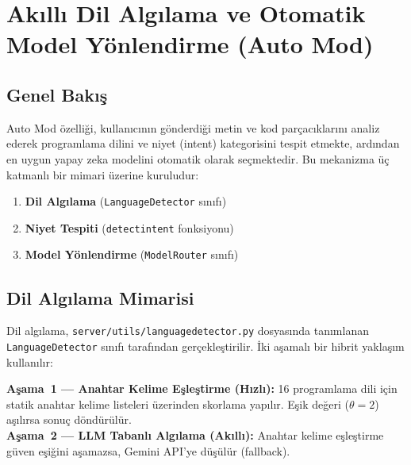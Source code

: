 \documentclass[12pt,a4paper]{article}
\begin{document}
\section{Akıllı Dil Algılama ve Otomatik Model Yönlendirme (Auto Mod)}
\label{sec:automod}

\subsection{Genel Bakış}

Auto Mod özelliği, kullanıcının gönderdiği metin ve kod parçacıklarını analiz ederek programlama dilini ve niyet (intent) kategorisini tespit etmekte, ardından en uygun yapay zeka modelini otomatik olarak seçmektedir. Bu mekanizma üç katmanlı bir mimari üzerine kuruludur:

\begin{enumerate}[label=\arabic*.]
    \item \textbf{Dil Algılama} (\texttt{LanguageDetector} sınıfı)
    \item \textbf{Niyet Tespiti} (\texttt{detect\textunderscore intent} fonksiyonu)
    \item \textbf{Model Yönlendirme} (\texttt{ModelRouter} sınıfı)
\end{enumerate}

\subsection{Dil Algılama Mimarisi}
\label{subsec:lang-detect}

Dil algılama, \texttt{server/utils/language\textunderscore detector.py} dosyasında tanımlanan \texttt{LanguageDetector} sınıfı tarafından gerçekleştirilir. İki aşamalı bir hibrit yaklaşım kullanılır:

\begin{tcolorbox}[colback=blue!5, colframe=blue!40!black, title=Hibrit Algılama Stratejisi]
\textbf{Aşama~1 --- Anahtar Kelime Eşleştirme (Hızlı):} 16 programlama dili için statik anahtar kelime listeleri üzerinden skorlama yapılır. Eşik değeri ($\theta = 2$) aşılırsa sonuç döndürülür.\\[0.2cm]
\textbf{Aşama~2 --- LLM Tabanlı Algılama (Akıllı):} Anahtar kelime eşleştirme güven eşiğini aşamazsa, Gemini API'ye düşülür (fallback).
\end{tcolorbox}
\end{document}
